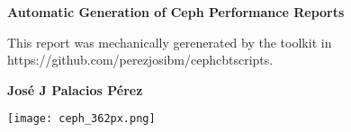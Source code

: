 \begin{titlepage}
   \begin{center}
       \vspace*{1cm}

       \Huge
       \textbf{Automatic Generation of Ceph Performance Reports}

       \vspace{0.5cm}
       \LARGE
This report was mechanically gerenerated by the toolkit in https://github.com/perezjosibm/cephcbtscripts.

       \vspace{1.5cm}

       \textbf{Jos\'e J Palacios P\'erez}

       \vfill

       \vspace{0.8cm}
       \texttt{[image: ceph\_362px.png]}
   \end{center}
\end{titlepage}
\tableofcontents
